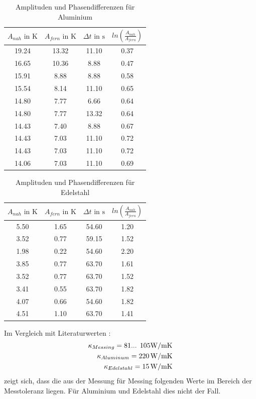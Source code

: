\begin{table}[b]
  \centering
  \caption{Amplituden und Phasendifferenzen für Aluminium}
  \label{tab:Alu}
  \begin{tabular}{c c c c}
    \toprule
    $A_{nah} \text{ in } \si{\kelvin}$ & $A_{fern} \text{ in } \si{\kelvin}$ & $\Delta t \text{ in } \si{\second}$ & $ ln(\frac{A_{nah}}{A_{fern}}) $ \\
    \midrule
    19.24 & 13.32 & 11.10 & 0.37 \\
    16.65 & 10.36 & 8.88 & 0.47 \\
    15.91 & 8.88 & 8.88 & 0.58 \\
    15.54 & 8.14 & 11.10 & 0.65 \\
    14.80 & 7.77 & 6.66 & 0.64 \\
    14.80 & 7.77 & 13.32 & 0.64 \\
    14.43 & 7.40 & 8.88 & 0.67 \\
    14.43 & 7.03 & 11.10 & 0.72 \\
    14.43 & 7.03 & 11.10 & 0.72 \\
    14.06 & 7.03 & 11.10 & 0.69 \\
    \bottomrule
  \end{tabular}
\end{table}

\begin{table}[b]
  \centering
  \caption{Amplituden und Phasendifferenzen für Edelstahl}
  \label{tab:Edelstahl}
  \begin{tabular}{c c c c}
    \toprule
    $A_{nah} \text{ in } \si{\kelvin}$ & $A_{fern} \text{ in } \si{\kelvin}$ & $\Delta t \text{ in } \si{\second}$ & $ln(\frac{A_{nah}}{A_{fern}})$\\
    \midrule
    5.50 & 1.65 & 54.60 & 1.20 \\
    3.52 & 0.77 & 59.15 & 1.52 \\
    1.98 & 0.22 & 54.60 & 2.20 \\
    3.85 & 0.77 & 63.70 & 1.61 \\
    3.52 & 0.77 & 63.70 & 1.52 \\
    3.41 & 0.55 & 63.70 & 1.82 \\
    4.07 & 0.66 & 54.60 & 1.82 \\
    4.51 & 1.10 & 63.70 & 1.41 \\
    \bottomrule
  \end{tabular}
\end{table}

Im Vergleich mit Literaturwerten \cite{literaturwerte}:
\begin{equation*}
  \begin{split}
    \kappa_{Messing} = \num{81}\text{... }\num{105}\si{\watt\per{\metre\kelvin}} \\
    \kappa_{Aluminum} = \SI{220}{\watt\per{\metre\kelvin}} \\
    \kappa_{Edelstahl} = \SI{15}{\watt\per{\metre\kelvin}}
  \end{split}
\end{equation*}
zeigt sich, dass die aus der Messung für Messing folgenden Werte im Bereich der Messtoleranz liegen. Für Aluminium und Edelstahl dies nicht der Fall.

